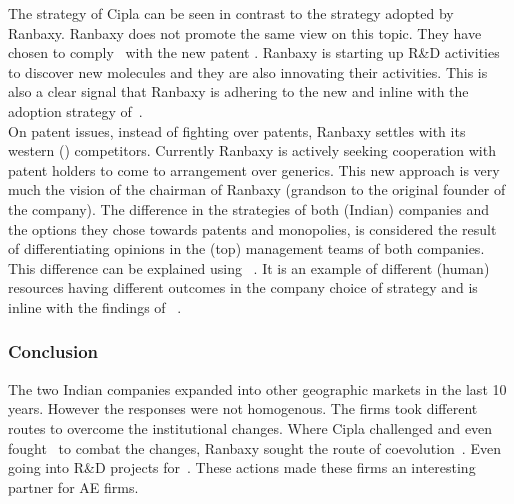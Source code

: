 The strategy of Cipla can be seen in contrast to the strategy adopted by Ranbaxy. 
Ranbaxy does not promote the same view on this topic.
They have chosen to comply~\citep{Oliver:1991tm} with the new patent \rr.
Ranbaxy is starting up R\&D activities to discover new molecules and they are also innovating their  activities.
This is also a clear signal that Ranbaxy is adhering to the new \rr and inline with the adoption strategy of~\citep{Cantwell:2009hg}.\\
On patent issues, instead of fighting over patents, Ranbaxy settles with its western () competitors.
Currently Ranbaxy is actively seeking cooperation with patent holders to come to arrangement over generics. 
This new approach is very much the vision of the chairman of Ranbaxy (grandson to the original founder of the company).
The difference in the strategies of both (Indian) companies and the options they chose towards patents and monopolies, is considered the result of differentiating opinions in the (top) management teams of both companies.
This difference can be explained using \rbt~\citep{Barney:2011jp,Barney:1991ur}.
It is an example of different (human) resources having different outcomes in the company choice of strategy and is inline with the findings of ~\citep{Barney:1991ur,Barney:2011jp}.

\subsubsection{Conclusion}
The two \pharmas Indian companies expanded into other geographic markets in the last 10 years.
However the responses were not homogenous. 
The firms took different routes to overcome the institutional changes.
Where Cipla challenged and even fought~\citep{Bartlett:1989vl} to combat the changes,
Ranbaxy sought the route of coevolution~\citep{Cantwell:2009hg}.
Even going into R\&D projects for~.
These actions made these firms an interesting partner for AE \pharma firms.
  


